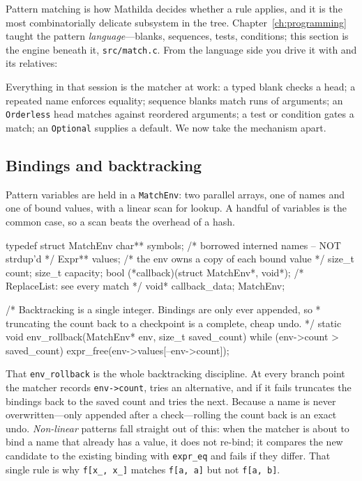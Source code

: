 Pattern matching is how Mathilda decides whether a rule applies, and it is the most
combinatorially delicate subsystem in the tree. Chapter~\ref{ch:programming} taught
the pattern \emph{language}---blanks, sequences, tests, conditions; this section is the
engine beneath it, \texttt{src/match.c}. From the language side you drive it with
 and its relatives:


Everything in that session is the matcher at work: a typed blank checks a head; a
repeated name enforces equality; sequence blanks match runs of arguments; an
\texttt{Orderless} head matches against reordered arguments; a test or condition
gates a match; an \texttt{Optional} supplies a default. We now take the mechanism
apart.

\subsection*{Bindings and backtracking}

Pattern variables are held in a \texttt{MatchEnv}: two parallel arrays, one of names
and one of bound values, with a linear scan for lookup. A handful of variables is the
common case, so a scan beats the overhead of a hash.

\begin{ccode}
typedef struct MatchEnv {
    char** symbols;     /* borrowed interned names -- NOT strdup'd     */
    Expr** values;      /* the env owns a copy of each bound value     */
    size_t count;
    size_t capacity;
    bool (*callback)(struct MatchEnv*, void*);  /* ReplaceList: see every match */
    void* callback_data;
} MatchEnv;

/* Backtracking is a single integer. Bindings are only ever appended, so
 * truncating the count back to a checkpoint is a complete, cheap undo. */
static void env_rollback(MatchEnv* env, size_t saved_count) {
    while (env->count > saved_count)
        expr_free(env->values[--env->count]);
}
\end{ccode}

That \texttt{env\_rollback} is the whole backtracking discipline. At every branch
point the matcher records \texttt{env->count}, tries an alternative, and if it fails
truncates the bindings back to the saved count and tries the next. Because a name is
never overwritten---only appended after a check---rolling the count back is an exact
undo. \emph{Non-linear} patterns fall straight out of this: when the matcher is about
to bind a name that already has a value, it does not re-bind; it compares the new
candidate to the existing binding with \texttt{expr\_eq} and fails if they differ.
That single rule is why \texttt{f[x\_, x\_]} matches \texttt{f[a, a]} but not
\texttt{f[a, b]}.

